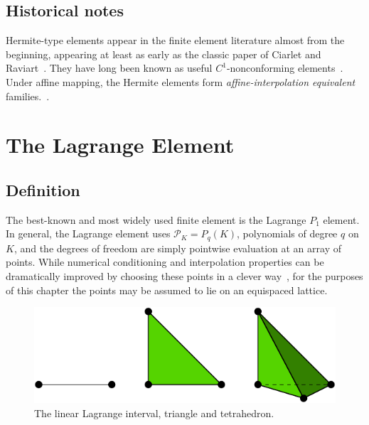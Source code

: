 \subsection{Historical notes}

Hermite-type elements appear in the finite element literature almost
from the beginning, appearing at least as early as the classic paper
of Ciarlet and Raviart~\cite{CiarletRaviart1972}. They have long been
known as useful \( C^1 \)-nonconforming
elements~\cite{Braess2007,Ciarlet2002}.  Under affine mapping, the
Hermite elements form
\emph{affine-interpolation equivalent} families.~\cite{BrennerScott2008}.

\newpage

\section{The Lagrange Element}

\subsection{Definition}

The best-known and most widely used finite element is the Lagrange
$P_1$ element. In general, the Lagrange element uses \( \mathcal{P}_K
= P_q(K) \), polynomials of degree $q$ on $K$, and the degrees of
freedom are simply pointwise evaluation at an array of points. While
numerical conditioning and interpolation properties can be
dramatically improved by choosing these points in a clever
way~\cite{missing}, for the purposes of this chapter the points may be
assumed to lie on an equispaced lattice.



\begin{figure}[h]
  \begin{center}
    \includegraphics[width=15cm]{chapters/kirby-6/pdf/P1-1d2d3d.pdf}
    \caption{The linear Lagrange interval, triangle and tetrahedron.}
  \end{center}
\end{figure}

